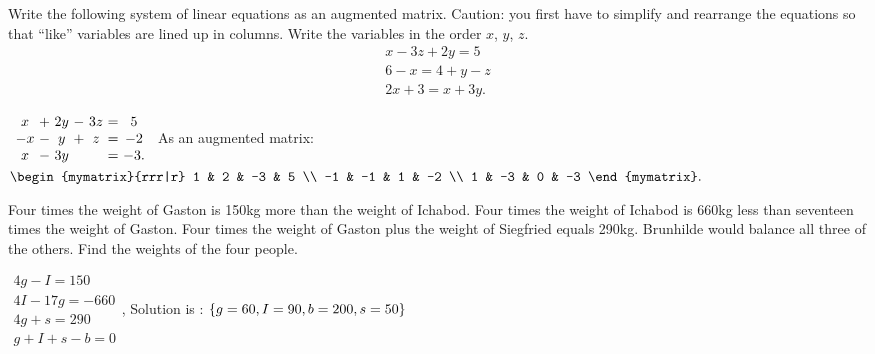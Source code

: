 \begin{ex}
  Write the following system of linear equations as an augmented
  matrix. Caution: you first have to simplify and rearrange the
  equations so that ``like'' variables are lined up in columns. Write
  the variables in the order $x$, $y$, $z$.
  \begin{equation*}
    \begin{array}{c}
      x - 3z + 2y = 5 \\
      6 - x = 4 + y - z \\
      2x + 3 = x + 3y.
    \end{array}
  \end{equation*}

  \begin{sol}
    $
    \begin{array}{c@{~}c@{~}c@{~}c@{~}c@{~}c@{~}c}
      x &+& 2y &-& 3z &=& 5 \\
      -x &-& y &+& z &=& -2 \\
      x &-& 3y && &=& -3. \\
    \end{array}
    $
    As an augmented matrix:
    $
    \begin{mymatrix}{rrr|r}
      1 & 2 & -3 & 5 \\
      -1 & -1 & 1 & -2 \\
      1 & -3 & 0 & -3
    \end{mymatrix}.
    $
  \end{sol}
\end{ex}

\begin{ex}
  Four times the weight of Gaston is 150kg more than the weight of
  Ichabod. Four times the weight of Ichabod is 660kg less than seventeen
  times the weight of Gaston. Four times the weight of Gaston plus the weight
  of Siegfried equals 290kg. Brunhilde would balance all three of the
  others. Find the weights of the four people.
  \begin{sol}
    $
    \begin{array}{c}
      4g-I=150 \\
      4I-17g=-660 \\
      4g+s=290 \\
      g+I+s-b=0
    \end{array}
    $, Solution is : $\left\{g=60,I=90,b=200,s=50\right\}$
  \end{sol}
\end{ex}

